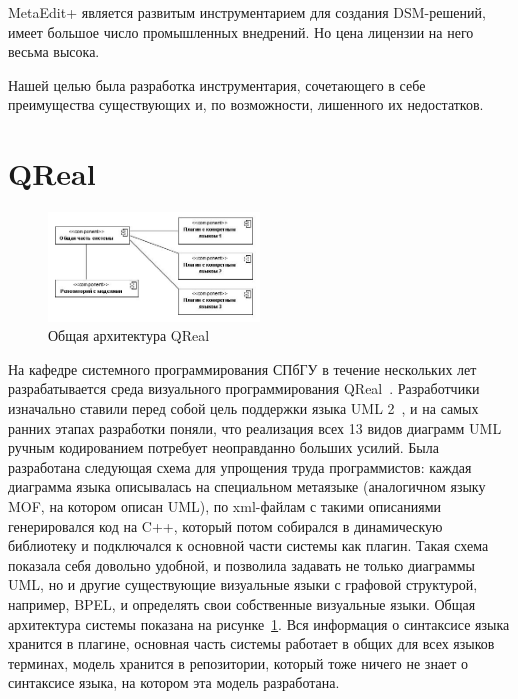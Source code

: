 \documentclass[a4paper]{article}
\begin{document}
MetaEdit+ является развитым инструментарием для создания DSM-решений, имеет большое число промышленных внедрений. Но цена лицензии на него весьма высока.

Нашей целью была разработка инструментария, сочетающего в себе преимущества существующих и, по возможности, лишенного их недостатков.

\section{QReal}

\begin{figure}
  \begin{center}
    \includegraphics[width=0.5\textwidth]{architecture.jpg}
    \caption{Общая архитектура QReal}
    \label{architecture}
  \end{center}
\end{figure}

На кафедре системного программирования СПбГУ в течение нескольких лет разрабатывается среда визуального программирования QReal~\cite{qReal}. Разработчики изначально ставили перед собой цель поддержки языка UML 2~\cite{uml}, и на самых ранних этапах разработки поняли, что реализация всех 13 видов диаграмм UML ручным кодированием потребует неоправданно больших усилий. Была разработана следующая схема для упрощения труда программистов: каждая диаграмма языка описывалась на специальном метаязыке (аналогичном языку MOF, на котором описан UML), по xml-файлам с такими описаниями генерировался код на C++, который потом собирался в динамическую библиотеку и подключался к основной части системы как плагин. Такая схема показала себя довольно удобной, и позволила задавать не только диаграммы UML, но и другие существующие визуальные языки с графовой структурой, например, BPEL, и определять свои собственные визуальные языки. Общая архитектура системы показана на рисунке~\ref{architecture}. Вся информация о синтаксисе языка хранится в плагине, основная часть системы работает в общих для всех языков терминах, модель хранится в репозитории, который тоже ничего не знает о синтаксисе языка, на котором эта модель разработана.
\end{document}

